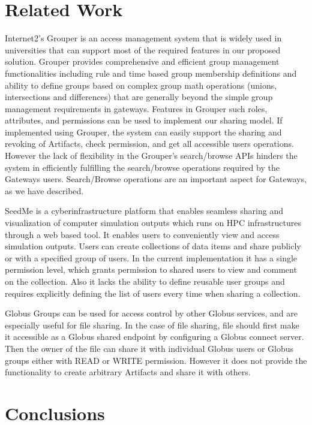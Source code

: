 \documentclass[sigconf]{acmart}
\begin{document}
\section{Related Work}

Internet2’s Grouper \cite{grouperWebsite} is an access management system that is widely used in universities that can support most of the required features in our proposed solution. Grouper provides comprehensive and efficient group management functionalities including rule and time based group membership definitions and ability to define groups based on complex group math operations (unions, intersections and differences) that are generally beyond the simple group management requirements in gateways. Features in Grouper such roles, attributes, and permissions can be used to implement our sharing model. If implemented using Grouper, the system can easily support the sharing and revoking of Artifacts, check permission, and get all accessible users operations. However the lack of flexibility in the Grouper’s search/browse APIs hinders the system in efficiently fulfilling the search/browse operations required by the Gateways users. Search/Browse operations are an important aspect for Gateways, as we have described.

SeedMe \cite{chourasia2013seedme} is a cyberinfrastructure platform that enables seamless sharing and visualization of computer simulation outputs which runs on HPC infrastructures through a web based tool. It enables users to conveniently view and access simulation outputs. Users can create collections of data items and share publicly or with a specified group of users. In the current implementation it has a single permission level, which grants permission to shared users to view and comment on the collection. Also it lacks the ability to define reusable user groups and requires explicitly defining the list of users every time when sharing a collection.

Globus Groups \cite{globusFileSharing} can be used for access control by other Globus services, and are especially useful for file sharing. In the case of file sharing, file should first make it accessible as a Globus shared endpoint by configuring a Globus connect server. Then the owner of the file can share it with individual Globus users or Globus groups either with READ or WRITE permission. However it does not provide the functionality to create arbitrary Artifacts and share it with others.

\section{Conclusions}
\end{document}
